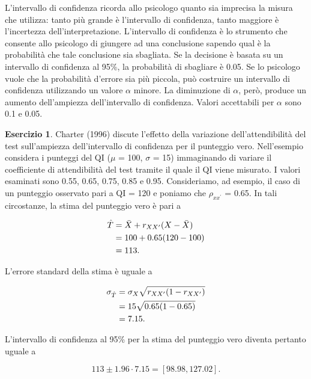 \documentclass[
  11pt,
]{krantz}
\theoremstyle{definition}
\theoremstyle{definition}
\theoremstyle{definition}
\newtheorem{exercise}{Esercizio}[chapter]
\theoremstyle{definition}
\theoremstyle{remark}
\begin{document}
L'intervallo di confidenza ricorda allo psicologo quanto sia imprecisa la misura che utilizza: tanto più grande è l'intervallo di confidenza, tanto maggiore è l'incertezza dell'interpretazione. L'intervallo di confidenza è lo strumento che consente allo psicologo di giungere ad una conclusione sapendo qual è la probabilità che tale conclusione sia sbagliata. Se la decisione è basata su un intervallo di confidenza al 95\%, la probabilità di sbagliare è 0.05. Se lo psicologo vuole che la probabilità d'errore sia più piccola, può costruire un intervallo di confidenza utilizzando un valore \(\alpha\) minore. La diminuzione di \(\alpha\), però, produce un aumento dell'ampiezza dell'intervallo di confidenza. Valori accettabili per \(\alpha\) sono 0.1 e 0.05.

\begin{exercise}
Charter (1996) discute l'effetto della variazione dell'attendibilità del test sull'ampiezza dell'intervallo di confidenza per il punteggio vero. Nell'esempio considera i punteggi del QI (\(\mu\) = 100, \(\sigma\) = 15) immaginando di variare il coefficiente di attendibilità del test tramite il quale il QI viene misurato. I valori esaminati sono 0.55, 0.65, 0.75, 0.85 e 0.95. Consideriamo, ad esempio, il caso di un punteggio osservato pari a QI = 120 e poniamo che \(\rho_{xx^\prime}\) = 0.65. In tali circostanze, la stima del punteggio vero è pari a

\begin{equation}
\begin{aligned}
\hat{T} &= \bar{X} + r_{XX^\prime}  (X - \bar{X}) \notag\\
&= 100 + 0.65 (120 - 100)\notag\\
&= 113.\notag
\end{aligned}
\end{equation}

L'errore standard della stima è uguale a

\begin{equation}
\begin{aligned}
\sigma_{\hat{T}} &= \sigma_{X} \sqrt{r_{XX^\prime} (1 - r_{XX^\prime})} \notag\\
&= 15 \sqrt{0.65 (1 - 0.65)}\notag\\
&= 7.15.\notag
\end{aligned}
\end{equation}

L'intervallo di confidenza al 95\% per la stima del punteggio vero diventa pertanto uguale a

\[
113 \pm 1.96 \cdot 7.15 = [98.98, 127.02].
\]
\end{exercise}
\end{document}
